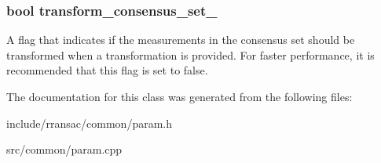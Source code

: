 \subsubsection[{\texorpdfstring{transform\+\_\+consensus\+\_\+set\+\_\+}{transform_consensus_set_}}]{\setlength{\rightskip}{0pt plus 5cm}bool transform\+\_\+consensus\+\_\+set\+\_\+}\hypertarget{classrransac_1_1Parameters_a88667595f4ccf6048a0257e49f5adbf5}{}\label{classrransac_1_1Parameters_a88667595f4ccf6048a0257e49f5adbf5}
A flag that indicates if the measurements in the consensus set should be transformed when a transformation is provided. For faster performance, it is recommended that this flag is set to false. 

The documentation for this class was generated from the following files\+:\begin{DoxyCompactItemize}
\item 
include/rransac/common/param.\+h\item 
src/common/param.\+cpp\end{DoxyCompactItemize}

